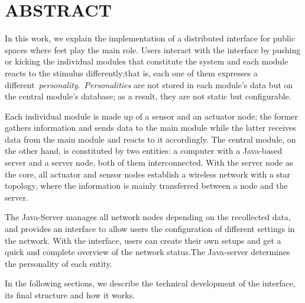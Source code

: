 \section{ABSTRACT}
In this work, we explain the implementation of a distributed interface for public spaces where feet play the main role. Users interact with the interface by pushing or kicking the individual modules that constitute the system and each module reacts to the stimulus differently;that is, each one of them expresses a different~\emph{personality}.~\emph{Personalities} are not stored in each module's data but on the  central module's database; as a result, they are not static but configurable.

Each individual module is made up of a sensor and an actuator node; the former gathers information and sends data to the main module while the latter receives data from the main module and reacts to it accordingly.
The central module, on the other hand, is constituted by two entities: a computer with a Java-based server and a server node, both of them interconnected. With the server node as the core, all actuator and sensor nodes establish a wireless network with a star topology, where the information is mainly transferred between a node and the server.  

The Java-Server manages all network nodes depending on the recollected data, and provides an interface to allow users the configuration of different settings in the network. With the interface, users can create their own setups and get a quick and complete overview of the network status.The Java-server determines the personality of each entity. 
 
In the following sections, we describe the technical development of the interface, its final structure and how it works. 

